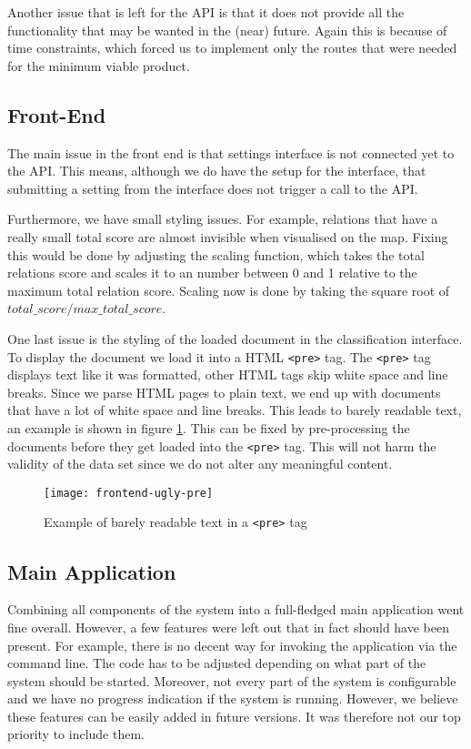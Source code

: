 Another issue that is left for the API is that it does not provide all the functionality that may be wanted in the (near) future. Again this is because of time constraints, which forced us to implement only the routes that were needed for the minimum viable product.

\subsection{Front-End}
The main issue in the front end is that settings interface is not connected yet to the API. This means, although we do have the setup for the interface, that submitting a setting from the interface does not trigger a call to the API.

Furthermore, we have small styling issues. For example, relations that have a really small total score are almost invisible when visualised on the map. Fixing this would be done by adjusting the scaling function, which takes the total relations score and scales it to an number between 0 and 1 relative to the maximum total relation score. Scaling now is done by taking the square root of $total\_score/max\_total\_score$.

One last issue is the styling of the loaded document in the classification interface. To display the document we load it into a HTML \texttt{<pre>} tag. The \texttt{<pre>} tag displays text like it was formatted, other HTML tags skip white space and line breaks. Since we parse HTML pages to plain text, we end up with documents that have a lot of white space and line breaks. This leads to barely readable text, an example is shown in figure \ref{fig:ugly-pre}. This can be fixed by pre-processing the documents before they get loaded into the \texttt{<pre>} tag. This will not harm the validity of the data set since we do not alter any meaningful content.

\begin{figure}[H]
\centering
\texttt{[image: frontend-ugly-pre]}
\caption{Example of barely readable text in a \texttt{<pre>} tag}
\label{fig:ugly-pre}
\end{figure}

\subsection{Main Application}
Combining all components of the system into a full-fledged main application went fine overall. However, a few features were left out that in fact should have been present. For example, there is no decent way for invoking the application via the command line. The code has to be adjusted depending on what part of the system should be started. Moreover, not every part of the system is configurable and we have no progress indication if the system is running. However, we believe these features can be easily added in future versions. It was therefore not our top priority to include them.


